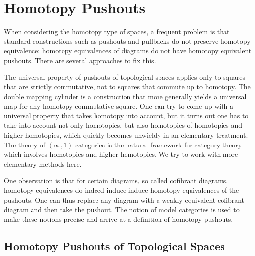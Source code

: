 \documentclass{scrartcl}
\theoremstyle{plain}
\theoremstyle{definition}
\begin{document}





\section{Homotopy Pushouts}

When considering the homotopy type of spaces, a frequent problem is that standard constructions such as pushouts and pullbacks do not preserve homotopy equivalence: homotopy equivalences of diagrams do not have homotopy equivalent pushouts. There are several approaches to fix this. 

The universal property of pushouts of topological spaces applies only to squares that are strictly commutative, not to squares that commute up to homotopy. The double mapping cylinder is a construction that more generally yields a universal map for any homotopy commutative square. One can try to come up with a universal property that takes homotopy into account, but it turns out one has to take into account not only homotopies, but also homotopies of homotopies and higher homotopies, which quickly becomes unwieldy in an elementary treatment. The theory of $(\infty, 1)$-categories is the natural framework for category theory which involves homotopies and higher homotopies. We try to work with more elementary methods here.

One observation is that for certain diagrams, so called cofibrant diagrams, homotopy equivalences do indeed induce induce homotopy equivalences of the pushouts. One can thus replace any diagram with a weakly equivalent cofibrant diagram and then take the pushout. The notion of model categories is used to make these notions precise and arrive at a definition of homotopy pushouts. 

\subsection{Homotopy Pushouts of Topological Spaces}
\end{document}
